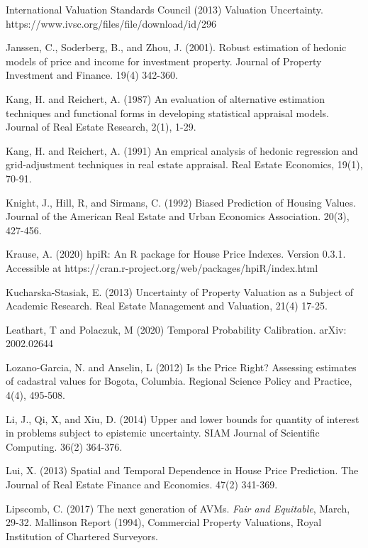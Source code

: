 \documentclass[colTwo]{format}
\theoremstyle{definition}
\begin{document}
\begin{thebibliography}{50}
\harvarditem{}{}{}International Valuation Standards Council (2013) Valuation Uncertainty. https://www.ivsc.org/files/file/download/id/296

\harvarditem{}{}{}Janssen, C., Soderberg, B., and Zhou, J. (2001). Robust estimation of hedonic models of price and income for investment property. Journal of Property Investment and Finance. 19(4) 342-360. 

\harvarditem{}{}{}Kang, H. and Reichert, A. (1987) An evaluation of alternative estimation techniques and functional forms in developing statistical appraisal models. Journal of Real Estate Research, 2(1), 1-29. 

\harvarditem{}{}{}Kang, H. and Reichert, A. (1991) An emprical analysis of hedonic regression and grid-adjustment techniques in real estate appraisal. Real Estate Economics, 19(1), 70-91. 

\harvarditem{}{}{}Knight, J., Hill, R, and Sirmans, C. (1992) Biased Prediction of Housing Values. Journal of the American Real Estate and Urban Economics Association. 20(3), 427-456. 

\harvarditem{}{}{}Krause, A. (2020) hpiR: An R package for House Price Indexes.  Version 0.3.1.  Accessible at https://cran.r-project.org/web/packages/hpiR/index.html

\harvarditem{}{}{}Kucharska-Stasiak, E. (2013) Uncertainty of Property Valuation as a Subject of Academic Research. Real Estate Management and Valuation, 21(4) 17-25.

\harvarditem{}{}{}Leathart, T and Polaczuk, M  (2020) Temporal Probability Calibration. arXiv: 2002.02644

\harvarditem{}{}{}Lozano-Garcia, N. and Anselin, L (2012) Is the Price Right?  Assessing estimates of cadastral values for Bogota, Columbia. Regional Science Policy and Practice, 4(4), 495-508.

\harvarditem{}{}{}Li, J., Qi, X, and Xiu, D. (2014) Upper and lower bounds for quantity of interest in problems subject to epistemic uncertainty. SIAM Journal of Scientific Computing. 36(2) 364-376.

\harvarditem{}{}{}Lui, X. (2013) Spatial and Temporal Dependence in House Price Prediction. The Journal of Real Estate Finance and Economics. 47(2) 341-369. 
 
\harvarditem{}{}{}Lipscomb, C. (2017) The next generation of AVMs. \textit{Fair and Equitable}, March, 29-32.  
\harvarditem{}{}{}Mallinson Report (1994), Commercial Property Valuations, Royal Institution of Chartered Surveyors.


\end{thebibliography}
\end{document}
